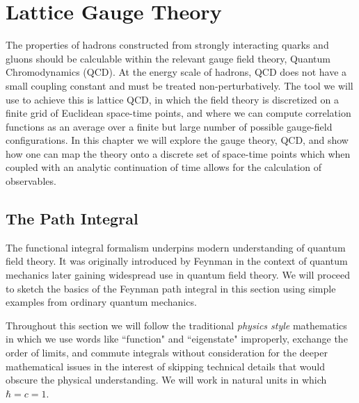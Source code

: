 \chapter{Lattice Gauge Theory} \label{chap::lattice_gauge_thy}

The properties of hadrons constructed from strongly interacting quarks and gluons should be calculable within the relevant gauge field theory, Quantum Chromodynamics (QCD). At the energy scale of hadrons, QCD does not have a small coupling constant and must be treated non-perturbatively. The tool we will use to achieve this is lattice QCD, in which the field theory is discretized on a finite grid of Euclidean space-time points, and where we can compute correlation functions as an average over a finite but large number of possible gauge-field configurations. In this chapter we will explore the gauge theory, QCD, and show how one can map the theory onto a discrete set of space-time points which when coupled with an analytic continuation of time allows for the calculation of observables. 


\section{The Path Integral } \label{QCD::path_integral}
The functional integral formalism underpins modern understanding of quantum field theory. It was originally introduced by Feynman in the context of quantum mechanics later gaining widespread use in quantum field theory. We will proceed to sketch the basics of the Feynman path integral in this section using simple examples from ordinary quantum mechanics. 

Throughout this section we will follow the traditional \emph{physics style} mathematics in which we use words like ``function" and ``eigenstate" improperly, exchange the order of limits, and commute integrals without consideration for the deeper mathematical issues in the interest of skipping technical details that would obscure the physical understanding. We will work in natural units in which $\hbar = c = 1$. 


